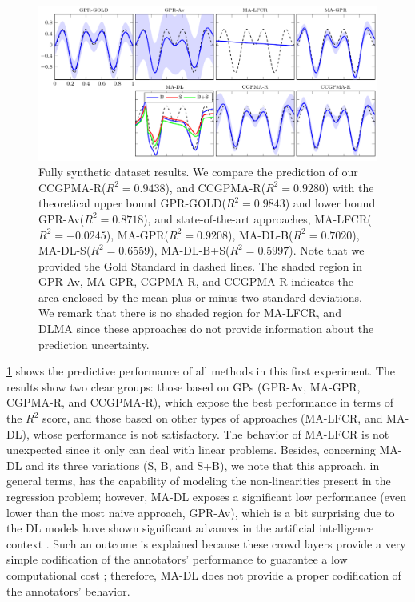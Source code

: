 \documentclass[journal]{IEEEtran}
\begin{document}
% 	    
\begin{figure}[!tb]
	\centering
% 	
	\includegraphics[width = \textwidth]{Figures/SinReg.pdf}
	\caption{Fully synthetic dataset results. We compare the prediction of our CCGPMA-R($R^2=0.9438$), and CCGPMA-R($R^2=0.9280$) with the theoretical upper bound GPR-GOLD($R^2=0.9843$) and lower bound GPR-Av($R^2=0.8718$), and state-of-the-art approaches, MA-LFCR($R^2=-0.0245$), MA-GPR($R^2=0.9208$),  MA-DL-B($R^2=0.7020$), MA-DL-S($R^2=0.6559$), MA-DL-B+S($R^2=0.5997$). Note that we provided the Gold Standard in dashed lines. The shaded region in GPR-Av, MA-GPR, CGPMA-R, and CCGPMA-R indicates the area enclosed by the mean plus or minus two standard deviations. We remark that there is no shaded region for MA-LFCR, and DLMA since these approaches do not provide information about the prediction uncertainty.}
	\label{fig:FSReg}
\end{figure}
\cref{fig:FSReg} shows the predictive performance of all methods in this first experiment. The results show two clear groups: those based on GPs (GPR-Av, MA-GPR, CGPMA-R, and CCGPMA-R), which expose the best performance in terms of the $R^2$ score, and those based on other types of approaches (MA-LFCR, and MA-DL), whose performance is not satisfactory. The behavior of MA-LFCR is not unexpected since it only can deal with linear problems. Besides, concerning MA-DL and its three variations (S, B, and S+B), we note that this approach, in general terms, has the capability of modeling the non-linearities present in the regression problem; however, MA-DL exposes a significant low performance (even lower than the most naive approach, GPR-Av), which is a bit surprising due to the DL models have shown significant advances in the artificial intelligence context \cite{schmidhuber2015deep}. Such an outcome is explained because these crowd layers provide a very simple codification of the annotators' performance to guarantee a low computational cost \cite{morales2019scalable1}; therefore, MA-DL does not provide a proper codification of the annotators' behavior. \\
\end{document}
